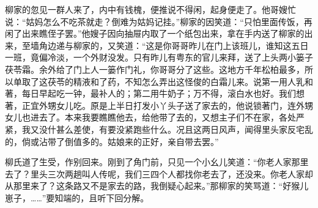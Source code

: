 \begin{parag}


    柳家的忽见一群人来了，内中有钱槐，便推说不得闲，起身便走了。他哥嫂忙说：“姑妈怎么不吃茶就走？倒难为姑妈记挂。”柳家的因笑道：“只怕里面传饭，再闲了出来瞧侄子罢。”他嫂子因向抽屉内取了一个纸包出来，拿在手内送了柳家的出来，至墙角边递与柳家的，又笑道：“这是你哥哥昨儿在门上该班儿，谁知这五日一班，竟偏冷淡，一个外财没发。只有昨儿有粤东的官儿来拜，送了上头两小篓子茯苓霜。余外给了门上人一篓作门礼，你哥哥分了这些。这地方千年松柏最多，所以单取了这茯苓的精液和了药，不知怎么弄出这怪俊的白霜儿来。说第一用人乳和著，每日早起吃一钟，最补人的；第二用牛奶子；万不得，滚白水也好。我们想著，正宜外甥女儿吃。原是上半日打发小丫头子送了家去的，他说锁著门，连外甥女儿也进去了。本来我要瞧瞧他去，给他带了去的，又想主子们不在家，各处严紧，我又没什甚么差使，有要没紧跑些什么。况且这两日风声，闻得里头家反宅乱的，倘或沾带了倒值多的。姑娘来的正好，亲自带去罢。”
\end{parag}


\begin{parag}


    柳氏道了生受，作别回来。刚到了角门前，只见一个小幺儿笑道：“你老人家那里去了？里头三次两趟叫人传呢，我们三四个人都找你老去了，还没来。你老人家却从那里来了？这条路又不是家去的路，我倒疑心起来。”那柳家的笑骂道：“好猴儿崽子，……”要知端的，且听下回分解。
\end{parag}
